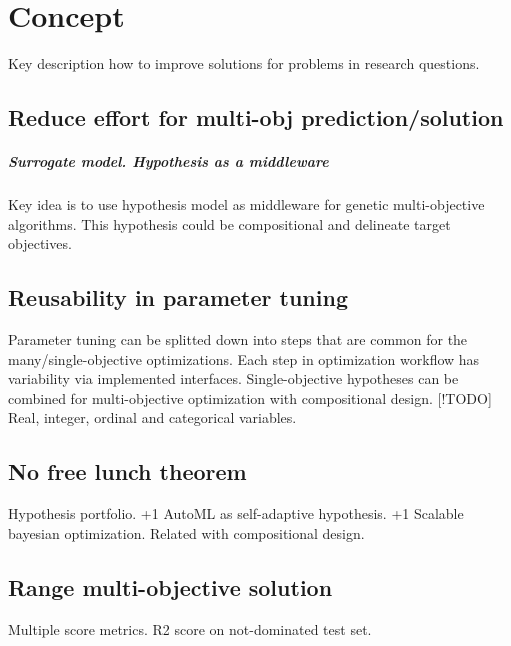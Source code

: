 \chapter{Concept}
Key description how to improve solutions for problems in research questions.

    \section{Reduce effort for multi-obj prediction/solution}
        \paragraph{Surrogate model. Hypothesis as a middleware}
        Key idea is to use hypothesis model as middleware for genetic multi-objective algorithms.
        This hypothesis could be compositional and delineate target objectives. 

    \section{Reusability in parameter tuning}
        Parameter tuning can be splitted down into steps that are common for the many/single-objective optimizations. 
        Each step in optimization workflow has variability via implemented interfaces.
        Single-objective hypotheses can be combined for multi-objective optimization with compositional design.
        [!TODO] Real, integer, ordinal and categorical variables.

    \section{No free lunch theorem}
        Hypothesis portfolio. +1 AutoML as self-adaptive hypothesis. +1 Scalable bayesian optimization. Related with compositional design.

    \section{Range multi-objective solution}
        Multiple score metrics. R2 score on not-dominated test set.


